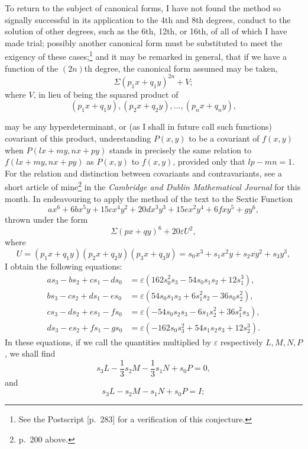 \documentclass[11pt]{article}
\newcommand{\sourcepage}[1]{\marginpar{\scriptsize p.~#1}}
\begin{document}
To return to the subject of canonical forms, I have not found the method so signally successful in its application to the 4th and 8th degrees, conduct to the solution of other degrees, such as the 6th, 12th, or 16th, of all of which I have made trial; possibly another canonical form must be substituted to meet the exigency of these cases;\footnote{See the Postscript [p.~283] for a verification of this conjecture.} and it may be remarked in general, that if we have a function of the $(2n)$th degree, the canonical form assumed may be taken,
\[
\Sigma(p_1x+q_1y)^{2n}+V;
\]
where $V$, in lieu of being the squared product of
\[
(p_1x+q_1y),(p_2x+q_2y),\ldots,(p_nx+q_ny),
\]

\sourcepage{280}
may be any hyperdeterminant, or (as I shall in future call such functions) covariant of this product, understanding $P(x,y)$ to be a covariant of $f(x,y)$ when $P(lx+my,nx+py)$ stands in precisely the same relation to $f(lx+my,nx+py)$ as $P(x,y)$ to $f(x,y)$, provided only that $lp-mn=1$. For the relation and distinction between covariants and contravariants, see a short article of mine\footnote{p.~200 above.} in the \emph{Cambridge and Dublin Mathematical Journal} for this month. In endeavouring to apply the method of the text to the Sextic Function
\[
ax^6+6bx^5y+15cx^4y^2+20dx^3y^3+15ex^2y^4+6fxy^5+gy^6,
\]
thrown under the form
\[
\Sigma(px+qy)^6+20\varepsilon U^2,
\]
where
\[
U=(p_1x+q_1y)(p_2x+q_2y)(p_3x+q_3y)
=s_0x^3+s_1x^2y+s_2xy^2+s_3y^3,
\]
I obtain the following equations:
\[
\begin{aligned}
as_3-bs_2+cs_1-ds_0&=\varepsilon(162s_0^2s_3-54s_0s_1s_2+12s_1^3),\\
bs_3-cs_2+ds_1-es_0&=\varepsilon(54s_0s_1s_3+6s_1^2s_2-36s_0s_2^2),\\
cs_3-ds_2+es_1-fs_0&=\varepsilon(-54s_0s_2s_3-6s_1s_2^2+36s_1^2s_3),\\
ds_3-es_2+fs_1-gs_0&=\varepsilon(-162s_0s_3^2+54s_1s_2s_3+12s_2^3).
\end{aligned}
\]
In these equations, if we call the quantities multiplied by $\varepsilon$ respectively $L,M,N,P$, we shall find
\[
s_3L-\frac13s_2M-\frac13s_1N+s_0P=0,
\]
and
\[
s_3L-s_2M-s_1N+s_0P=I;
\]
\end{document}
